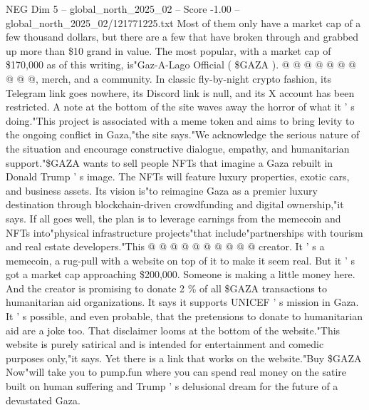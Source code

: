 \begin{textsample}{NEG Dim 5 – global\_north\_2025\_02 – Score -1.00 – global\_north\_2025\_02/121771225.txt}
Most of them only have a market cap of a few thousand dollars, but there are a few that have broken through and grabbed up more than \$10 grand in value.
The most popular, with a market cap of \$170,000 as of this writing, is"Gaz-A-Lago Official ( \$GAZA ). @ @ @ @ @ @ @ @ @ @, merch, and a community.
In classic fly-by-night crypto fashion, its Telegram link goes nowhere, its Discord link is null, and its X account has been restricted.
A note at the bottom of the site waves away the horror of what it ' s doing."This project is associated with a meme token and aims to bring levity to the ongoing conflict in Gaza,"the site says."We acknowledge the serious nature of the situation and encourage constructive dialogue, empathy, and humanitarian support."\$GAZA wants to sell people NFTs that imagine a Gaza rebuilt in Donald Trump ' s image.
The NFTs will feature luxury properties, exotic cars, and business assets.
Its vision is"to reimagine Gaza as a premier luxury destination through blockchain-driven crowdfunding and digital ownership,"it says.
If all goes well, the plan is to leverage earnings from the memecoin and NFTs into"physical infrastructure projects"that include"partnerships with tourism and real estate developers."This @ @ @ @ @ @ @ @ @ @ creator.
It ' s a memecoin, a rug-pull with a website on top of it to make it seem real.
But it ' s got a market cap approaching \$200,000.
Someone is making a little money here.
And the creator is promising to donate 2 \% of all \$GAZA transactions to humanitarian aid organizations.
It says it supports UNICEF ' s mission in Gaza.
It ' s possible, and even probable, that the pretensions to donate to humanitarian aid are a joke too.
That disclaimer looms at the bottom of the website."This website is purely satirical and is intended for entertainment and comedic purposes only,"it says.
Yet there is a link that works on the website."Buy \$GAZA Now"will take you to pump.fun where you can spend real money on the satire built on human suffering and Trump ' s delusional dream for the future of a devastated Gaza.

\end{textsample}
